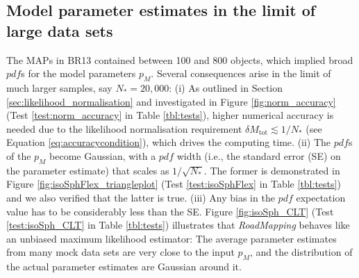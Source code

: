 \documentclass[iop,revtex4,numberedappendix,appendixfloats]{emulateapj}
\newcommand{\pdf}{\ensuremath{pdf}}
\newcommand{\pmodel}{\ensuremath{p_M}}
\newcommand{\MAP}{MAP}
\newcommand{\RM}{{\sl RoadMapping}}
\begin{document}

\subsection{Model parameter estimates in the limit of large data sets} \label{sec:largedata}

The \MAP{}s in BR13 contained between 100 and 800 objects, which implied broad \pdf{}s for the model parameters $\pmodel{}$. Several consequences arise in the limit of much larger samples, say $N_{*} = 20,000$: (i) As outlined in Section \ref{sec:likelihood_normalisation} and investigated in Figure \ref{fig:norm_accuracy} (Test \ref{test:norm_accuracy} in Table \ref{tbl:tests}), higher numerical accuracy is needed due to the likelihood normalisation requirement $\delta M_\text{tot} \lesssim 1/N_{*}$ (see Equation \eqref{eq:accuracycondition}), which drives the computing time. (ii) The \pdf{}s of the \pmodel{} become Gaussian, with a \pdf{} width (i.e., the standard error (SE) on the parameter estimate) that scales as $1/\sqrt{N_{*}}$. The former is demonstrated in Figure \ref{fig:isoSphFlex_triangleplot} (Test \ref{test:isoSphFlex} in Table \ref{tbl:tests}) and we also verified that the latter is true. (iii) Any bias in the \pdf{} expectation value has to be considerably less than the SE. Figure \ref{fig:isoSph_CLT} (Test \ref{test:isoSph_CLT} in Table \ref{tbl:tests}) illustrates that \RM{} behaves like an unbiased maximum likelihood estimator: The average parameter estimates from many mock data sets are very close to the input \pmodel{}, and the distribution of the actual parameter estimates are Gaussian around it.
\end{document}
